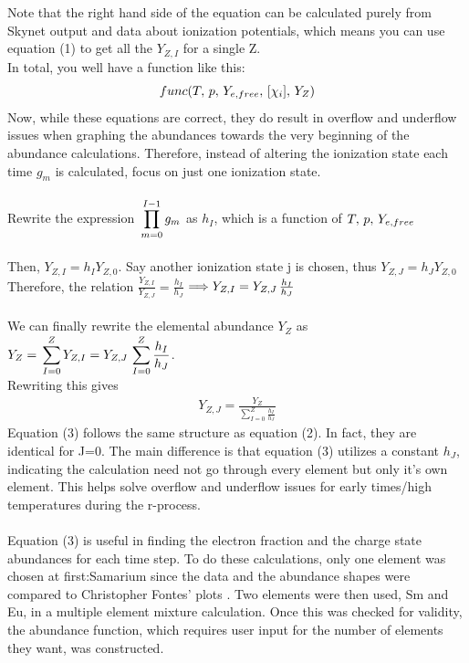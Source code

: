 \documentclass[11pt,a4paper]{article}
\begin{document}
Note that the right hand side of the equation can be calculated purely from Skynet output and data about ionization potentials, which means you can use equation (1) to get all the $Y_{Z,I}$ for a single Z. 
\\
In total, you well have a function like this: $$func(T,\thinspace p,\thinspace Y_{e,free},\thinspace [\chi_i],\thinspace Y_Z)$$
Now, while these equations are correct, they do result in overflow and underflow issues when graphing the abundances towards the very beginning of the abundance calculations. Therefore, instead of altering the ionization state each time $g_m$ is calculated, focus on just one ionization state. 
\\\\
Rewrite the expression  $\thinspace \displaystyle \prod_{m=0}^{I - 1} g_m$ as $h_I$, which is a function of $T,\thinspace p,\thinspace Y_{e,free}$ \\\\
Then, $Y_{Z,I} = h_I  Y_{Z,0}$. Say another ionization state j is chosen, thus $Y_{Z,J} = h_J  Y_{Z,0}$ \\Therefore, the relation $\frac{Y_{Z,I}}{Y_{Z,J}} = \frac{h_I}{h_J} $ $\Longrightarrow
Y_{Z,I} = Y_{Z,J}\thinspace \frac{h_I}{h_J}$ \\\\
We can finally rewrite the elemental abundance $Y_Z$ as $Y_Z =\thinspace \displaystyle \sum_{I=0}^{Z} Y_{Z,I} = Y_{Z,J}\thinspace \displaystyle \sum_{I=0}^{Z} \frac{h_I}{h_J} $.\\ Rewriting this gives 
\begin{align}
Y_{Z,J} = \frac{Y_Z}{\displaystyle \sum_{I=0}^{Z} \frac{h_I}{h_J}}
\end{align} 
Equation (3) follows the same structure as equation (2). In fact, they are identical for J=0. The main difference is that equation (3) utilizes a constant $h_J$, indicating the calculation need not go through every element but only it's own element. This helps solve overflow and underflow issues for early times/high temperatures during the r-process. \\\\
Equation (3) is useful in finding the electron fraction and the charge state abundances for each time step. To do these calculations, only one element was chosen at first:Samarium since the data and the abundance shapes were compared to Christopher Fontes' plots \cite{fontes2017linesmeared}. Two elements were then used, Sm and Eu, in a multiple element mixture calculation. Once this was checked for validity, the abundance function, which requires user input for the number of elements they want, was constructed. \\
\end{document}
